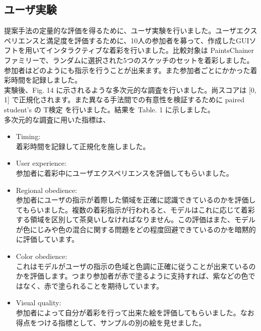 \documentclass[a4paper, dvipdfmx, 10pt]{article}
\begin{document}
\subsection{ユーザ実験}
\label{sec:orgc71c844}
提案手法の定量的な評価を得るために、ユーザ実験を行いました。ユーザエクスペリエンスと満足度を評価するために、10人の参加者を募って、作成したGUIソフトを用いてインタラクティブな着彩を行いました。比較対象は PaintsChainer ファミリーで、ランダムに選択された5つのスケッチのセットを着彩しました。参加者はどのようにも指示を行うことが出来ます。また参加者ごとにかかった着彩時間を記録しました。\\

実験後、Fig. 14 に示されるような多次元的な調査を行いました。尚スコアは [0, 1] で正規化されます。また異なる手法間での有意性を検証するために paired student's の T検定 を行いました。結果を Table. 1 に示しました。\\

多次元的な調査に用いた指標は、\\

\begin{itemize}
\item Timing:\\

着彩時間を記録して正規化を施しました。\\

\item User experience:\\

参加者に着彩中にユーザエクスペリエンスを評価してもらいました。\\

\item Regional obedience:\\

参加者にユーザの指示が着際した領域を正確に認識できているのかを評価してもらいました。複数の着彩指示が行われると、モデルはこれに応じて着彩する領域を区別して茶臭いしなければなりません。この評価はまた、モデルが色にじみや色の混合に関する問題をどの程度回避できているのかを暗黙的に評価しています。\\

\item Color obedience:\\

これはモデルがユーザの指示の色域と色調に正確に従うことが出来ているのかを評価します。つまり参加者が赤で塗るように支持すれば、紫などの色ではなく、赤で塗られることを期待しています。\\

\item Visual quality:\\

参加者によって自分が着彩を行って出来た絵を評価してもらいました。なお得点をつける指標として、サンプルの別の絵を見せました。\\
\end{itemize}
\end{document}
